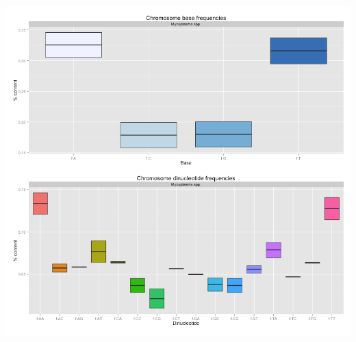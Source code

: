 \begin{frame}
\begin{columns}[T]
\begin{column}{5cm}
     \includegraphics[height=0.5\textheight]{images/kmer_mycoplasma}\\
   \end{column}
  \end{columns}
\end{frame}